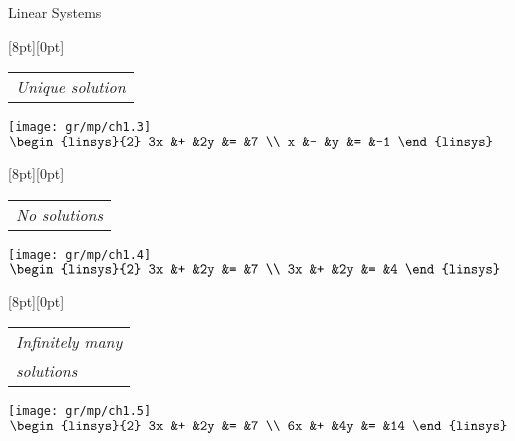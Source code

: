 \begin{frame}{Linear Systems}
    \begin{center}
        \begin{minipage}[b]{1.8in}
            \raisebox{-2pt}[8pt][0pt]{\small \begin{tabular}{@{}l}
                    \small \textit{Unique solution}
                \end{tabular}}
            \begin{center}
                \texttt{[image: gr/mp/ch1.3]} \\[.75ex]
                \small $\begin{linsys}{2}
                        3x  &+  &2y  &=  &7   \\
                        x   &-  &y   &=  &-1
                    \end{linsys}$
            \end{center}
        \end{minipage}
        \hspace*{0em}
        \begin{minipage}[b]{1.8in}
            \raisebox{-2pt}[8pt][0pt]{\small \begin{tabular}{@{}l}
                    \small \textit{No solutions}
                \end{tabular}}
            \begin{center}
                \texttt{[image: gr/mp/ch1.4]} \\[.75ex]
                \small $\begin{linsys}{2}
                        3x  &+  &2y  &=  &7   \\
                        3x  &+  &2y  &=  &4
                    \end{linsys}$
            \end{center}
        \end{minipage}
        \hspace*{0em}
        \begin{minipage}[b]{1.8in}
            \raisebox{-2pt}[8pt][0pt]{\small \begin{tabular}[t]{@{}l}
                    \textit{Infinitely many} \\
                    \textit{solutions}
                \end{tabular}}
            \begin{center}
                \texttt{[image: gr/mp/ch1.5]}         \\[.75ex]
                \small $ \begin{linsys}{2}
                        3x  &+  &2y  &=  &7   \\
                        6x  &+  &4y  &=  &14
                    \end{linsys}$
            \end{center}
        \end{minipage}
    \end{center}
\end{frame}

